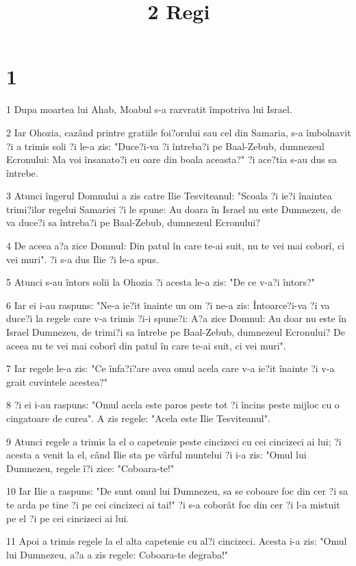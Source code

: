 

\title{2 Regi}


\chapter{1}

\par 1 Dupa moartea lui Ahab, Moabul s-a razvratit împotriva lui Israel.
\par 2 Iar Ohozia, cazând printre gratiile foi?orului sau cel din Samaria, s-a îmbolnavit ?i a trimis soli ?i le-a zis: "Duce?i-va ?i întreba?i pe Baal-Zebub, dumnezeul Ecronului: Ma voi însanato?i eu oare din boala aceasta?" ?i ace?tia s-au dus sa întrebe.
\par 3 Atunci îngerul Domnului a zis catre Ilie Tesviteanul: "Scoala ?i ie?i înaintea trimi?ilor regelui Samariei ?i le spune: Au doara în Israel nu este Dumnezeu, de va duce?i sa întreba?i pe Baal-Zebub, dumnezeul Ecronului?
\par 4 De aceea a?a zice Domnul: Din patul în care te-ai suit, nu te vei mai coborî, ci vei muri". ?i s-a dus Ilie ?i le-a spus.
\par 5 Atunci s-au întors solii la Ohozia ?i acesta le-a zis: "De ce v-a?i întors?"
\par 6 Iar ei i-au raspuns: "Ne-a ie?it înainte un om ?i ne-a zis: Întoarce?i-va ?i va duce?i la regele care v-a trimis ?i-i spune?i: A?a zice Domnul: Au doar nu este în Israel Dumnezeu, de trimi?i sa întrebe pe Baal-Zebub, dumnezeul Ecronului? De aceea nu te vei mai coborî din patul în care te-ai suit, ci vei muri".
\par 7 Iar regele le-a zis: "Ce înfa?i?are avea omul acela care v-a ie?it înainte ?i v-a grait cuvintele acestea?"
\par 8 ?i ei i-au raspuns: "Omul acela este paros peste tot ?i încins peste mijloc cu o cingatoare de curea". A zis regele: "Acela este Ilie Tesviteanul".
\par 9 Atunci regele a trimis la el o capetenie peste cincizeci cu cei cincizeci ai lui; ?i acesta a venit la el, când Ilie sta pe vârful muntelui ?i i-a zis: "Omul lui Dumnezeu, regele î?i zice: "Coboara-te!"
\par 10 Iar Ilie a raspuns: "De sunt omul lui Dumnezeu, sa se coboare foc din cer ?i sa te arda pe tine ?i pe cei cincizeci ai tai!" ?i s-a coborât foc din cer ?i l-a mistuit pe el ?i pe cei cincizeci ai lui.
\par 11 Apoi a trimis regele la el alta capetenie cu al?i cincizeci. Acesta i-a zis: "Omul lui Dumnezeu, a?a a zis regele: Coboara-te degraba!"
